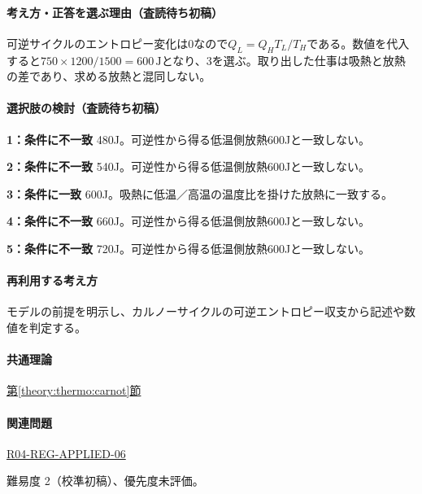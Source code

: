 \paragraph{考え方・正答を選ぶ理由（査読待ち初稿）} 可逆サイクルのエントロピー変化は0なので\(Q_L=Q_HT_L/T_H\)である。数値を代入すると\(750\times1200/1500=600\,\mathrm{J}\)となり、3を選ぶ。取り出した仕事は吸熱と放熱の差であり、求める放熱と混同しない。

\paragraph{選択肢の検討（査読待ち初稿）}\mbox{}\par

\noindent\textbf{1：条件に不一致} 480J。可逆性から得る低温側放熱600Jと一致しない。\par

\noindent\textbf{2：条件に不一致} 540J。可逆性から得る低温側放熱600Jと一致しない。\par

\noindent\textbf{3：条件に一致} 600J。吸熱に低温／高温の温度比を掛けた放熱に一致する。\par

\noindent\textbf{4：条件に不一致} 660J。可逆性から得る低温側放熱600Jと一致しない。\par

\noindent\textbf{5：条件に不一致} 720J。可逆性から得る低温側放熱600Jと一致しない。\par

\paragraph{再利用する考え方} モデルの前提を明示し、カルノーサイクルの可逆エントロピー収支から記述や数値を判定する。

\paragraph{共通理論} \hyperref[theory:thermo:carnot]{第\ref*{theory:thermo:carnot}節}

\paragraph{関連問題} \hyperref[q:r04-reg-applied-06]{R04-REG-APPLIED-06}

\par 難易度 2（校準初稿）、優先度未評価。

